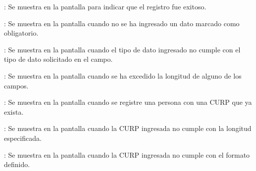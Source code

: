 \begin{Citemize}
	\item {}: Se muestra en la pantalla  para indicar que el registro fue exitoso.
	\item {}: Se muestra en la pantalla  cuando no se ha ingresado un dato marcado como obligatorio.
	\item {}: Se muestra en la pantalla  cuando el tipo de dato ingresado no cumple con el tipo de dato solicitado en el campo.
	\item {}: Se muestra en la pantalla  cuando se ha excedido la longitud de alguno de los campos.
	\item {}: Se muestra en la pantalla  cuando se registre una persona con una CURP que ya exista.
	\item {}: Se muestra en la pantalla  cuando la CURP ingresada no cumple con la longitud especificada.
	\item {}: Se muestra en la pantalla  cuando la CURP ingresada no cumple con el formato definido.
\end{Citemize}
